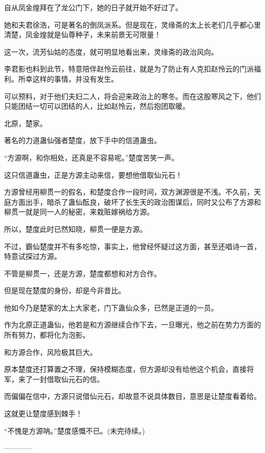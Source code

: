 \begin{this_body}
自从凤金煌拜在了龙公门下，她的日子就开始不好过了。

她和夫君徐浩，可是著名的倒凤派系。但是现在，灵缘斋的太上长老们几乎都心里清楚，凤金煌就是仙尊种子，未来前景无可限量！

这一次，流芳仙姑的态度，就可明显地看出来，灵缘斋的政治风向。

李君影也料到此节，特意陪伴赵怜云前往，就是为了防止有人克扣赵怜云的门派福利。所幸这样的事情，并没有发生。

可以预料，对于他们夫妇二人，将会迎来政治上的寒冬。而在这股寒风之下，他们只能团结一切可以团结的人，比如赵怜云，然后抱团取暖。

北原，楚家。

著名的力道蛊仙强者楚度，放下手中的信道蛊虫。

“方源啊，和你相处，还真是不容易呢。”楚度苦笑一声。

这只信道蛊虫，正是方源主动来信，要想他借取仙元石！

方源曾经用柳贯一的假名，和楚度合作一段时间，双方渊源很是不浅。不久前，天庭方面出手，暗杀了蛊仙酝良，破坏了长生天的政治图谋后，同时又公布了方源和柳贯一就是同一人的秘密，来栽赃嫁祸给方源。

所以，楚度此时已然知晓，柳贯一便是方源。

不过，霸仙楚度并不有多吃惊，事实上，他曾经怀疑过这方面，甚至还唱诗一首，特意试探过方源。

不管是柳贯一，还是方源，楚度都想和对方合作。

但是现在楚度的身份，却是今非昔比。

他如今乃是楚家的太上大家老，门下蛊仙众多，已然是正道的一员。

作为北原正道蛊仙，他若是和方源继续合作下去，一旦曝光，他之前在势力方面的所有努力，都将化为泡影。

和方源合作，风险极其巨大。

原本楚度还打算置之不理，保持模糊态度，但方源却没有给他这个机会，直接将军，来了一封借取仙元石的信。

而偏偏在信中，方源只说借仙元石，却故意不说具体数目，意思是让楚度看着给。

这就更让楚度感到棘手！

“不愧是方源呐。”楚度感慨不已。(未完待续。)

------------

\end{this_body}


